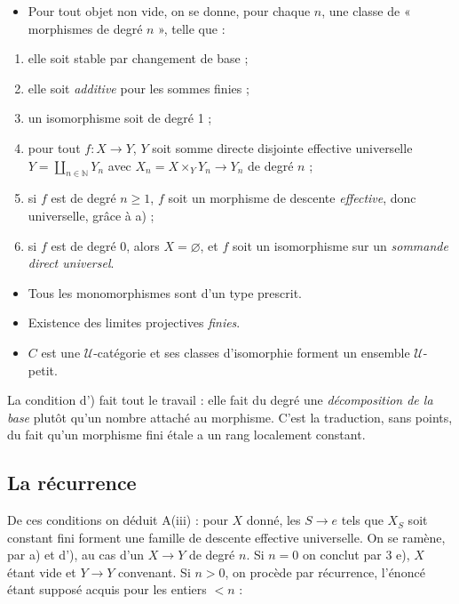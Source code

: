 \documentclass[11pt,a4paper]{article}
\begin{document}
\begin{itemize}
\item[\textbf{(3)}] Pour tout objet non vide, on se donne, pour chaque $n$, une
  classe de « morphismes de degré $n$ », telle que :
\end{itemize}

\begin{enumerate}
  \item[a)] elle soit stable par changement de base ;
  \item[b)] elle soit \emph{additive} pour les sommes finies ;
  \item[c)] un isomorphisme soit de degré 1 ;
  \item[d')] pour tout $f : X \to Y$, $Y$ soit somme directe disjointe
    effective universelle $Y = \coprod_{n \in \mathbb{N}} Y_{n}$ avec
    $X_{n} = X \times_{Y} Y_{n} \to Y_{n}$ de degré $n$ ;
  \item[d)] si $f$ est de degré $n \geqslant 1$, $f$ soit un morphisme de
    descente \emph{effective}, donc universelle, grâce à a) ;
  \item[e)] si $f$ est de degré $0$, alors $X = \varnothing$, et $f$ soit un
    isomorphisme sur un \emph{sommande direct universel}.
\end{enumerate}

\begin{itemize}
\item[\textbf{(2)}] Tous les monomorphismes sont d'un type prescrit.
\item[\textbf{(1)}] Existence des limites projectives \emph{finies}.
\item[\textbf{(0)}] $C$ est une $\mathcal{U}$-catégorie et ses classes
  d'isomorphie forment un ensemble $\mathcal{U}$-petit.
\end{itemize}

La condition d') fait tout le travail : elle fait du degré une
\emph{décomposition de la base} plutôt qu'un nombre attaché au morphisme.
C'est la traduction, sans points, du fait qu'un morphisme fini
étale a un rang localement constant.

\subsection*{La récurrence}

De ces conditions on déduit A(iii) : pour $X$ donné, les $S \to e$ tels que
$X_{S}$ soit constant fini forment une famille de descente effective
universelle. On se ramène, par a) et d'), au cas d'un $X \to Y$ de degré $n$.
Si $n = 0$ on conclut par 3 e), $X$ étant vide et $Y \to Y$ convenant. Si
$n > 0$, on procède par récurrence, l'énoncé étant supposé acquis pour les
entiers $< n$ :
\end{document}

